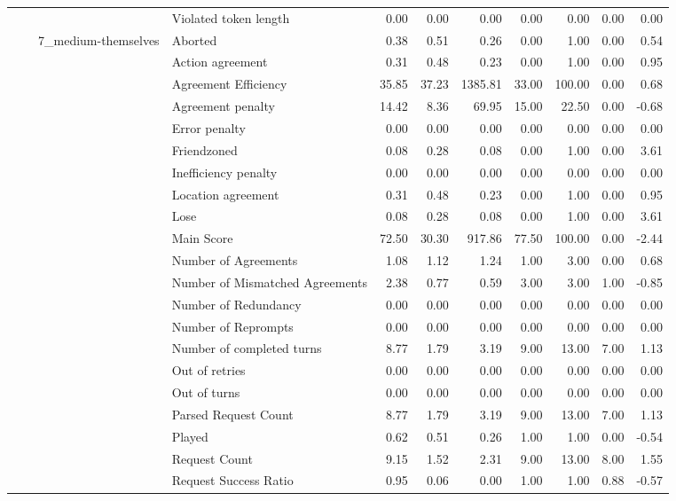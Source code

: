 \begin{tabular}{llllrrrrrrr}
 &  &  & Violated token length & 0.00 & 0.00 & 0.00 & 0.00 & 0.00 & 0.00 & 0.00 \\
\cline{3-11}
 &  & \multirow[t]{27}{*}{7_medium-themselves} & Aborted & 0.38 & 0.51 & 0.26 & 0.00 & 1.00 & 0.00 & 0.54 \\
 &  &  & Action agreement & 0.31 & 0.48 & 0.23 & 0.00 & 1.00 & 0.00 & 0.95 \\
 &  &  & Agreement Efficiency & 35.85 & 37.23 & 1385.81 & 33.00 & 100.00 & 0.00 & 0.68 \\
 &  &  & Agreement penalty & 14.42 & 8.36 & 69.95 & 15.00 & 22.50 & 0.00 & -0.68 \\
 &  &  & Error penalty & 0.00 & 0.00 & 0.00 & 0.00 & 0.00 & 0.00 & 0.00 \\
 &  &  & Friendzoned & 0.08 & 0.28 & 0.08 & 0.00 & 1.00 & 0.00 & 3.61 \\
 &  &  & Inefficiency penalty & 0.00 & 0.00 & 0.00 & 0.00 & 0.00 & 0.00 & 0.00 \\
 &  &  & Location agreement & 0.31 & 0.48 & 0.23 & 0.00 & 1.00 & 0.00 & 0.95 \\
 &  &  & Lose & 0.08 & 0.28 & 0.08 & 0.00 & 1.00 & 0.00 & 3.61 \\
 &  &  & Main Score & 72.50 & 30.30 & 917.86 & 77.50 & 100.00 & 0.00 & -2.44 \\
 &  &  & Number of Agreements & 1.08 & 1.12 & 1.24 & 1.00 & 3.00 & 0.00 & 0.68 \\
 &  &  & Number of Mismatched Agreements & 2.38 & 0.77 & 0.59 & 3.00 & 3.00 & 1.00 & -0.85 \\
 &  &  & Number of Redundancy & 0.00 & 0.00 & 0.00 & 0.00 & 0.00 & 0.00 & 0.00 \\
 &  &  & Number of Reprompts & 0.00 & 0.00 & 0.00 & 0.00 & 0.00 & 0.00 & 0.00 \\
 &  &  & Number of completed turns & 8.77 & 1.79 & 3.19 & 9.00 & 13.00 & 7.00 & 1.13 \\
 &  &  & Out of retries & 0.00 & 0.00 & 0.00 & 0.00 & 0.00 & 0.00 & 0.00 \\
 &  &  & Out of turns & 0.00 & 0.00 & 0.00 & 0.00 & 0.00 & 0.00 & 0.00 \\
 &  &  & Parsed Request Count & 8.77 & 1.79 & 3.19 & 9.00 & 13.00 & 7.00 & 1.13 \\
 &  &  & Played & 0.62 & 0.51 & 0.26 & 1.00 & 1.00 & 0.00 & -0.54 \\
 &  &  & Request Count & 9.15 & 1.52 & 2.31 & 9.00 & 13.00 & 8.00 & 1.55 \\
 &  &  & Request Success Ratio & 0.95 & 0.06 & 0.00 & 1.00 & 1.00 & 0.88 & -0.57 \\

\end{tabular}

